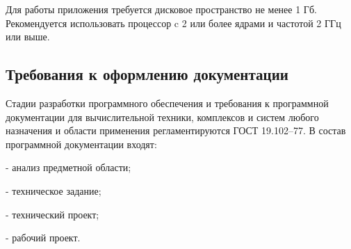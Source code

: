 Для работы приложения требуется дисковое пространство не менее 1 Гб. Рекомендуется использовать процессор c 2 или более ядрами и частотой 2 ГГц или выше.

\subsection{Требования к оформлению документации}

Стадии разработки программного обеспечения и требования к программной документации для вычислительной техники, комплексов и систем любого назначения и области применения регламентируются ГОСТ 19.102–77. В состав программной документации входят:

-	анализ предметной области;

-	техническое задание;

-	технический проект;

-	рабочий проект.
